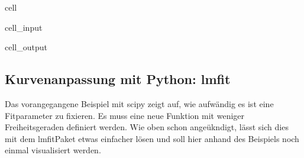 \documentclass[letterpaper,10pt,english]{jupyterBook}
\begin{document}
\begin{sphinxuseclass}{cell}
\begin{sphinxVerbatimInput}
\begin{sphinxuseclass}{cell_input}
\begin{sphinxVerbatim}[commandchars=\\\{\}]
\PYG{p}{[}\PYG{p}{]}
\end{sphinxVerbatim}

\end{sphinxuseclass}\end{sphinxVerbatimInput}
\begin{sphinxVerbatimOutput}

\begin{sphinxuseclass}{cell_output}
\noindent{}

\noindent{}

\end{sphinxuseclass}\end{sphinxVerbatimOutput}

\end{sphinxuseclass}

\subsection{Kurvenanpassung mit Python: lmfit }
\label{\detokenize{content/T_FitmitFehlerbalken:kurvenanpassung-mit-python-lmfit-a-id-subsec-lmfit-bsp2-a}}
\sphinxAtStartPar
Das vorangegangene Beispiel mit scipy zeigt auf, wie aufwändig es ist eine Fitparameter zu fixieren. Es muss eine neue Funktion mit weniger Freiheitsgeraden definiert werden. Wie oben schon angeükndigt, lässt sich dies mit dem lmfit\sphinxhyphen{}Paket etwas einfacher lösen und soll hier anhand des Beispiels noch einmal visualisiert werden.
\end{document}
